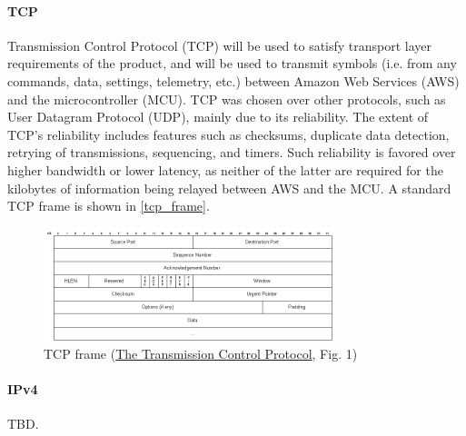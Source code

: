 \paragraph{TCP} Transmission Control Protocol (TCP) will be used to satisfy transport layer
requirements of the product, and will be used to transmit symbols (i.e.
from any commands, data, settings, telemetry, etc.) between Amazon Web
Services (AWS) and the microcontroller (MCU). TCP was chosen over other
protocols, such as User Datagram Protocol (UDP), mainly due to its
reliability. The extent of TCP's reliability includes features such as
checksums, duplicate data detection, retrying of transmissions, sequencing,
and timers.
Such reliability is favored over higher bandwidth or lower
latency, as neither of the latter are required for the kilobytes
of information being relayed between AWS and the MCU. A standard TCP frame
is shown in \autoref{tcp_frame}.
\begin{figure}[H]
    \caption{TCP frame (\href{https://condor.depaul.edu/jkristof/technotes/tcp.html}{The Transmission Control Protocol}, Fig. 1)}
    \label{tcp_frame}
    \centering
    \includegraphics[width=0.75\textwidth]{images/tcp_frame.jpg}
\end{figure}

\paragraph{IPv4} TBD. 



